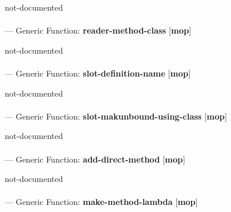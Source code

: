 \begin{adjustwidth}{5em}{5em}
not-documented
\end{adjustwidth}

\paragraph{}
\label{MOP:READER-METHOD-CLASS}
--- Generic Function: \textbf{reader-method-class} [\textbf{mop}] \textit{}

\begin{adjustwidth}{5em}{5em}
not-documented
\end{adjustwidth}

\paragraph{}
\label{MOP:SLOT-DEFINITION-NAME}
--- Generic Function: \textbf{slot-definition-name} [\textbf{mop}] \textit{}

\begin{adjustwidth}{5em}{5em}
not-documented
\end{adjustwidth}

\paragraph{}
\label{MOP:SLOT-MAKUNBOUND-USING-CLASS}
--- Generic Function: \textbf{slot-makunbound-using-class} [\textbf{mop}] \textit{}

\begin{adjustwidth}{5em}{5em}
not-documented
\end{adjustwidth}

\paragraph{}
\label{MOP:ADD-DIRECT-METHOD}
--- Generic Function: \textbf{add-direct-method} [\textbf{mop}] \textit{}

\begin{adjustwidth}{5em}{5em}
not-documented
\end{adjustwidth}

\paragraph{}
\label{MOP:MAKE-METHOD-LAMBDA}
--- Generic Function: \textbf{make-method-lambda} [\textbf{mop}] \textit{}

